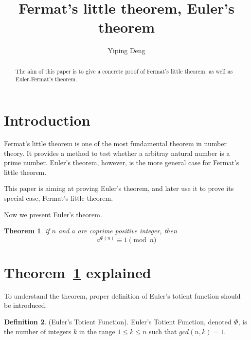 \documentclass[12pt,a4paper]{amsart}
\numberwithin{equation}{section}
\theoremstyle{plain}
\newtheorem{Th}{Theorem}[section]
\theoremstyle{definition}
\newtheorem{Def}[Th]{Definition}
\begin{document}
\title{Fermat's little theorem, Euler's theorem}

\author[Y. Deng]{Yiping Deng}

\address{P.O 182 College Ring 7, 28759 Bremen, Germany} 














\begin{abstract}
    The aim of this paper is to give a concrete proof of
    Fermat's little theorem, as well as Euler-Fermat's theorem.
\end{abstract}

\maketitle

\section{Introduction} Fermat's little theorem is one of
the most fundamental theorem in number theory. It provides
a method to test whether a arbitray natural number is a prime
number. Euler's theorem, however, is the more general case
for Fermat's little theorem.

This paper is aiming at proving Euler's theorem, and later
use it to prove its special case, Fermat's little theorem.

Now we present Euler's theorem.

\begin{Th} \label{main} \cite{basicdef} if $n$ and $a$ are coprime positive
    integer, then $$a^{\Phi(n)} \equiv 1 \pmod n$$
\end{Th}

\section{Theorem~\ref{main} explained} To understand the theorem, proper definition of Euler's
totient function should be introduced.
\begin{Def} \label{eulerfct} (Euler's Totient Function). Euler's Totient Function, denoted $\Phi$,
    is the number of integers $k$ in the range $1 \leq k \leq n$ such that $gcd(n, k) = 1$. \cite{basicdef}
\end{Def}
\end{document}
